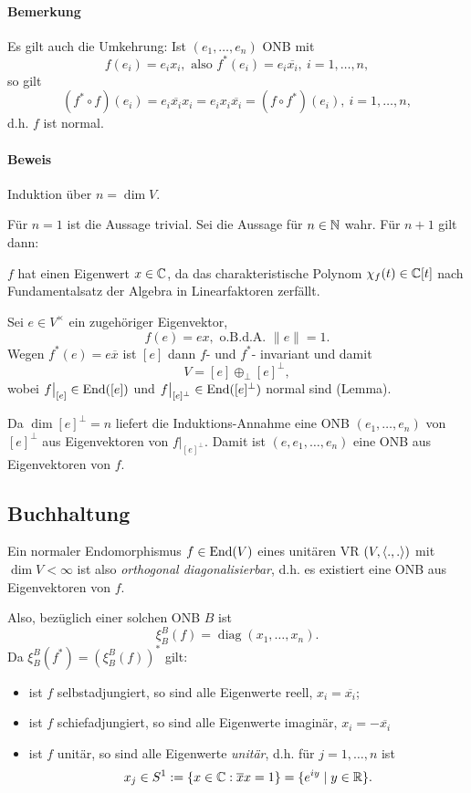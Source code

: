 \paragraph{Bemerkung}
	Es gilt auch die Umkehrung: Ist $ (e_1,\dots,e_n) $ ONB mit
		\[ f(e_i) = e_ix_i, \text{ also } f^*(e_i) = e_i\overline{x_i},\ i=1,\dots,n, \]
	so gilt
		\[ (f^*\circ f)(e_i) = e_i\overline{x_i}x_i = e_ix_i\overline{x_i} = (f\circ f^*)(e_i),\ i=1,\dots,n, \]
	d.h. $ f $ ist normal.
\paragraph{Beweis}
	Induktion über $ n=\dim V $.
	
	Für $ n=1 $ ist die Aussage trivial. Sei die Aussage für $ n\in\mathbb{N} $ wahr. Für $ n+1 $ gilt dann:
	
	$ f $ hat einen Eigenwert $ x\in \mathbb{C} $, da das charakteristische Polynom $ \chi_f(t)\in \mathbb{C}[t] $ nach Fundamentalsatz der Algebra in Linearfaktoren zerfällt.
	
	Sei $ e\in V^\times $ ein zugehöriger Eigenvektor,
		\[ f(e)=ex, \text{ o.B.d.A. } \|e\| = 1. \]
	Wegen $ f^*(e)=e\overline x $ ist $ [e] $ dann $ f $- und $ f^* $- invariant und damit
		\[ V=[e] \oplus_\perp [e]^\perp, \]
	wobei $ f\big|_{[e]}\in \operatorname{End}([e]) $ und $ f\big|_{[e]^\perp}\in \operatorname{End}([e]^\perp) $ normal sind (Lemma).
	
	Da $ \dim [e]^\perp = n$ liefert die Induktions-Annahme eine ONB $ (e_1,\dots,e_n) $ von $ [e]^\perp $ aus Eigenvektoren von $ f\big|_{[e]^\perp} $. Damit ist $ (e,e_1,\dots,e_n) $ eine ONB aus Eigenvektoren von $ f $.

\subsection{Buchhaltung}
	Ein normaler Endomorphismus $ f\in \operatorname{End}(V) $ eines unitären VR $ (V,\langle .,. \rangle) $ mit $ \dim V < \infty $ ist also \emph{orthogonal diagonalisierbar}, d.h. es existiert eine ONB aus Eigenvektoren von $ f $.
	
	Also, bezüglich einer solchen ONB $ B $ ist
		\[ \xi_B^B(f) = \operatorname{diag}(x_1,\dots,x_n). \]
	Da $ \xi_B^B(f^*) = (\xi_B^B(f))^* $ gilt:
		\begin{itemize}
			\item ist $ f $ selbstadjungiert, so sind alle Eigenwerte reell, $ x_i = \overline{x_i} $;
			\item ist $ f $ schiefadjungiert, so sind alle Eigenwerte imaginär, $ x_i = -\overline{x_i} $
			\item ist $ f $ unitär, so sind alle Eigenwerte \emph{unitär}, d.h. für $ j=1,\dots,n $ ist
				\[ x_j\in S^1 := \{x\in \mathbb{C}:\overline{x}x = 1\} = \{e^{iy}\mid y\in \mathbb{R}\}. \]
		\end{itemize}

